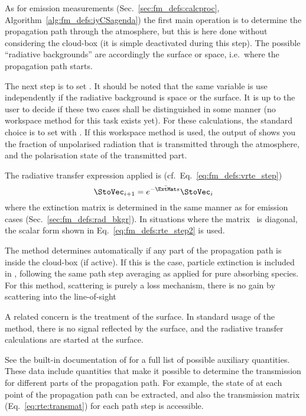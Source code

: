 As for emission measurements (Sec.~\ref{sec:fm_defs:calcproc},
Algorithm~\ref{alg:fm_defs:iyCSagenda}) the first main operation is to
determine the propagation path through the atmosphere, but this is here done
without considering the cloud-box (it is simple deactivated during this step).
The possible ``radiative backgrounds'' are accordingly the surface or space,
i.e.\ where the propagation path starts. 

The next step is to set . It should be
noted that the same variable is use independently if the radiative background
is space or the surface. It is up to the user to decide if these two cases
shall be distinguished in some manner (no workspace method for this task exists
yet). For these calculations, the standard choice is to set
 with . If this
workspace method is used, the output of 
shows you the fraction of unpolarised radiation that is transmitted through the
atmosphere, and the polarisation state of the transmitted part.

The radiative transfer expression applied is
(cf.~Eq.~\ref{eq:fm_defs:vrte_step})
\begin{equation}
  \label{eq:trans:vrte}
  \StoVec_{i+1} = e^{-\bar{\ExtMat}s} \StoVec_i 
\end{equation}
where the extinction matrix is determined in the same manner as for emission
cases (Sec.~\ref{sec:fm_defs:rad_bkgr}). In situations where the matrix
\ExtMat\ is diagonal, the scalar form shown in Eq.~\ref{eq:fm_defs:rte_step2}
is used.

The method determines automatically if any part of the propagation path is
inside the cloud-box (if active). If this is the case, particle extinction is
included in \ExtMat, following the same path step averaging as applied for
pure absorbing species. For this method, scattering is purely a loss mechanism,
there is no gain by scattering into the line-of-sight

A related concern is the treatment of the surface. In standard usage of the
method, there is no signal reflected by the surface, and the radiative transfer
calculations are started at the surface.

See the built-in documentation of  for a
full list of possible auxiliary quantities. These data include quantities that
make it possible to determine the transmission for different parts of the
propagation path. For example, the state of  at each point of
the propagation path can be extracted, and also the transmission matrix
(Eq.~\ref{eq:rte:transmat}) for each path step is accessible.




